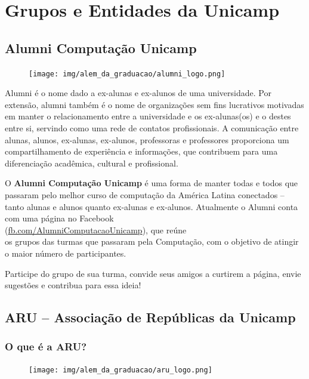 
\section{Grupos e Entidades da Unicamp}

\subsection{Alumni Computação Unicamp}

\begin{figure}[H]
  \centering
  \texttt{[image: img/alem\_da\_graduacao/alumni\_logo.png]}
\end{figure}

Alumni é o nome dado a ex-alunas e ex-alunos de uma universidade. Por extensão,
alumni também é o nome de organizações sem fins lucrativos motivadas em manter
o relacionamento entre a universidade e os ex-alunas(os) e o destes entre si,
servindo como uma rede de contatos profissionais. A comunicação entre alunas,
alunos, ex-alunas, ex-alunos, professoras e professores proporciona um
compartilhamento de experiência e informações, que contribuem para uma
diferenciação acadêmica, cultural e profissional.

O \textbf{Alumni Computação Unicamp} é uma forma de manter todas e todos que
passaram pelo melhor curso de computação da América Latina conectados -- tanto
alunas e alunos quanto ex-alunas e ex-alunos. Atualmente o Alumni conta com uma
página no Facebook \\(\url{fb.com/AlumniComputacaoUnicamp}), que reúne\\os
grupos das turmas que passaram pela Computação, com o objetivo de atingir o
maior número de participantes.

Participe do grupo de sua turma, convide seus amigos a curtirem a página, envie
sugestões e contribua para essa ideia!

\subsection{ARU -- Associação de Repúblicas da Unicamp}

\subsubsection{O que é a ARU?}

\begin{figure}[H]
  \centering
  \texttt{[image: img/alem\_da\_graduacao/aru\_logo.png]}
\end{figure}


